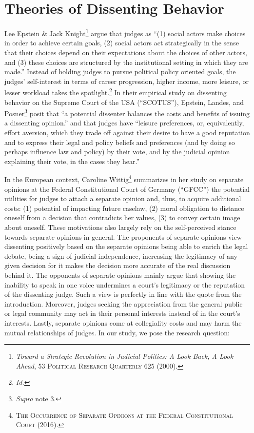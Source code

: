 \documentclass[
  11pt,
]{article}
\begin{document}
\section{Theories of Dissenting Behavior}\label{theory-dissent}

Lee Epstein \& Jack Knight\footnote{\emph{Toward a {Strategic Revolution} in {Judicial Politics}: {A Look Back}, {A Look Ahead}}, 53 \textsc{Political Research Quarterly} 625 (2000).} argue that judges as ``(1) social actors make choices in order to achieve certain goals, (2) social actors act strategically in the sense that their choices depend on their expectations about the choices of other actors, and (3) these choices are structured by the institutional setting in which they are made.'' Instead of holding judges to pursue political policy oriented goals, the judges' self-interest in terms of career progression, higher income, more leisure, or lesser workload takes the spotlight.\footnote{\emph{Id.}} In their empirical study on dissenting behavior on the Supreme Court of the USA (``SCOTUS''), Epstein, Landes, and Posner\footnote{\emph{Supra} note 3.} posit that ``a potential dissenter balances the costs and benefits of issuing a dissenting opinion.'' and that judges have ``leisure preferences, or, equivalently, effort aversion, which they trade off against their desire to have a good reputation and to express their legal and policy beliefs and preferences (and by doing so perhaps influence law and policy) by their vote, and by the judicial opinion explaining their vote, in the cases they hear.''

In the European context, Caroline Wittig\footnote{\textsc{The {Occurrence} of {Separate Opinions} at the {Federal Constitutional Court}} (2016).} summarizes in her study on separate opinions at the Federal Constitutional Court of Germany (``GFCC'') the potential utilities for judges to attach a separate opinion and, thus, to acquire additional costs: (1) potential of impacting future caselaw, (2) moral obligation to distance oneself from a decision that contradicts her values, (3) to convey certain image about oneself. These motivations also largely rely on the self-perceived stance towards separate opinions in general. The proponents of separate opinions view dissenting positively based on the separate opinions being able to enrich the legal debate, being a sign of judicial independence, increasing the legitimacy of any given decision for it makes the decision more accurate of the real discussion behind it. The opponents of separate opinions mainly argue that showing the inability to speak in one voice undermines a court's legitimacy or the reputation of the dissenting judge. Such a view is perfectly in line with the quote from the introduction. Moreover, judges seeking the appreciation from the general public or legal community may act in their personal interests instead of in the court's interests. Lastly, separate opinions come at collegiality costs and may harm the mutual relationships of judges. In our study, we pose the research question:
\end{document}
